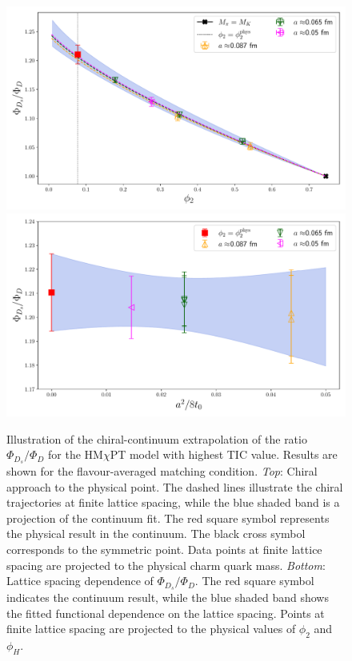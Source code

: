 \begin{figure}[!htb]
	\centering
	\includegraphics[scale=0.50]{./cap6/figs/fds/fit_fds_ratio_fds_over_fd.pdf}
	\includegraphics[scale=0.50]{./cap6/figs/fds/fit_cl_fds_ratio_fds.pdf}
	\caption{Illustration of the chiral-continuum extrapolation of the ratio $\Phi_{D_s}/\Phi_D$ for the HM$\chi$PT model with highest TIC value. Results are shown for the flavour-averaged matching condition. \textit{Top}:  Chiral approach to the physical point. The dashed lines illustrate the chiral trajectories at finite lattice spacing, while the blue shaded band is a projection of the continuum fit. The red square symbol represents the physical result in the continuum. The black cross symbol corresponds to the symmetric point. Data points at finite lattice spacing are projected to the physical charm quark mass. \textit{Bottom}: Lattice spacing dependence of  $\Phi_{D_s}/\Phi_D$. The red square symbol indicates the continuum result, while the blue shaded band shows the fitted functional dependence on the lattice spacing.  Points at finite lattice spacing are projected to the physical values of $\phi_2$ and $\phi_H$.}
	\label{fig:fds_ratio}
\end{figure}

